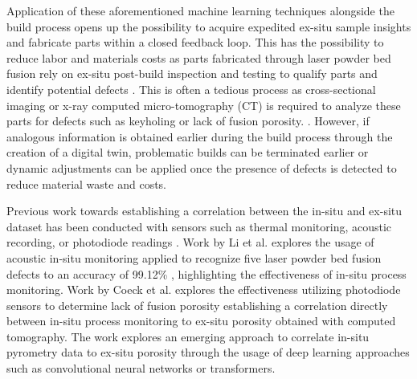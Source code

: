 Application of these aforementioned machine learning techniques alongside the
build process opens up the possibility to acquire expedited ex-situ sample
insights and fabricate parts within a closed feedback loop. This has the
possibility to reduce labor and materials costs as parts fabricated through
laser powder bed fusion rely on ex-situ post-build inspection and testing to
qualify parts and identify potential defects \cite{damon_process_2018,
feng_additive_2022, chen_review_2022, donegan_multimodal_2021}. This is often a
tedious process as cross-sectional imaging or x-ray computed micro-tomography
(CT) is required to analyze these parts for defects such as keyholing or lack of
fusion porosity. \cite{ogoke_inexpensive_2023,myers_high-resolution_2023}.
However, if analogous information is obtained earlier during the build process
through the creation of a digital twin, problematic builds can be terminated
earlier or dynamic adjustments can be applied once the presence of defects is
detected to reduce material waste and costs.

Previous work towards establishing a correlation between the in-situ and ex-situ
dataset has been conducted with sensors such as thermal monitoring, acoustic
recording, or photodiode readings \cite{feng_additive_2022,
rodriguez_approximation_2015, li_-situ_2024, coeck_prediction_2019}. Work by Li
et al. explores the usage of acoustic in-situ monitoring applied to recognize
five laser powder bed fusion defects to an accuracy of 99.12\%
\cite{li_-situ_2024}, highlighting the effectiveness of in-situ process
monitoring. Work by Coeck et al. \cite{coeck_prediction_2019} explores the
effectiveness utilizing photodiode sensors to determine lack of fusion porosity
establishing a correlation directly between in-situ process monitoring to
ex-situ porosity obtained with computed tomography. The work explores an
emerging approach to correlate in-situ pyrometry data to ex-situ porosity
through the usage of deep learning approaches such as convolutional neural
networks or transformers.


